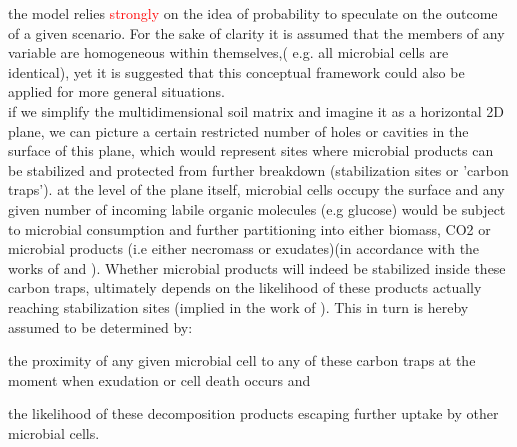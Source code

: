 \documentclass[12pt]{report}
\newcommand{\myRed}[1]{\textcolor{red}{#1}} %
\begin{document}
the model relies \myRed{strongly} on the idea of probability to speculate on the outcome of a given scenario.
For the sake of clarity it is assumed that the members of any variable are homogeneous within themselves,( e.g. all microbial cells are identical), yet it is suggested that this conceptual framework could also be applied for more general situations.\\ 
if we simplify the multidimensional soil matrix and imagine it as a horizontal 2D plane, we can picture a certain restricted number of holes or cavities in the surface of this plane, which would represent sites where microbial products can be stabilized and protected from further breakdown (stabilization sites or 'carbon traps'). at the level of the plane itself, microbial cells occupy the surface and any given number of incoming labile organic molecules (e.g glucose) would be subject to microbial consumption and further partitioning into either biomass, CO2 or microbial products (i.e either necromass or exudates)(in accordance with the works of \citeauthor{fischer2010} and \citeauthor{gunina2014}). Whether microbial products will indeed be stabilized inside these carbon traps, ultimately depends on the likelihood of these products actually reaching stabilization sites (implied in the work of \citeauthor{kravchenko2015}). This in turn is hereby assumed to be determined by:
\begin{enumerate*}[label=(\arabic*)]
	\item the proximity of any given microbial cell to any of these carbon traps at the moment when exudation or cell death occurs and
	\item the likelihood of these decomposition products escaping further uptake by other microbial cells. 
\end{enumerate*}\\
\end{document}

